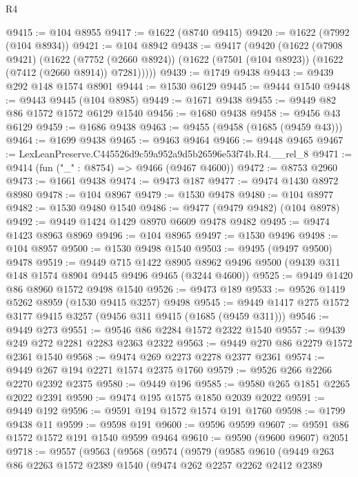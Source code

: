 \begin{lexlean}{R4}
\begin{coremodule}
@9415 := @104 @8955
@9417 := @1622 (@8740 @9415)
@9420 := @1622 (@7992 (@104 @8934))
@9421 := @104 @8942
@9438 := @9417
    (@9420
      (@1622
        (@7908 @9421)
        (@1622
          (@7752 (@2660 @8924))
          (@1622 (@7501 (@104 @8923)) (@1622 (@7412 (@2660 @8914)) @7281)))))
@9439 := @1749 @9438
@9443 := @9439 @292 @148 @1574 @8901
@9444 := @1530 @6129
@9445 := @9444 @1540
@9448 := @9443 @9445 (@104 @8985)
@9449 := @1671 @9438
@9455 := @9449 @82 @86 @1572 @1572 @6129 @1540
@9456 := @1680 @9438
@9458 := @9456 @43 @6129
@9459 := @1686 @9438
@9463 := @9455 (@9458 (@1685 (@9459 @43)))
@9464 := @1699 @9438
@9465 := @9463 @9464
@9466 := @9448 @9465
@9467 := LexLeanPreserve.C445526d9c59a952a9d5b26596e53f74b.R4.__rel_8
@9471 := @9414 (fun ("_" : @8754) => @9466 (@9467 @4600))
@9472 := @8753 @2960
@9473 := @1661 @9438
@9474 := @9473 @187
@9477 := @9474 @1430 @8972 @8980
@9478 := @104 @8967
@9479 := @1530 @9478
@9480 := @104 @8977
@9482 := @1530 @9480 @1540
@9486 := @9477 (@9479 @9482) (@104 @8978)
@9492 := @9449 @1424 @1429 @8970 @6609 @9478 @9482
@9495 := @9474 @1423 @8963 @8969
@9496 := @104 @8965
@9497 := @1530 @9496
@9498 := @104 @8957
@9500 := @1530 @9498 @1540
@9503 := @9495 (@9497 @9500) @9478
@9519 := @9449
    @715
    @1422
    @8905
    @8962
    @9496
    @9500
    (@9439 @311 @148 @1574 @8904 @9445 @9496 @9465 (@3244 @4600))
@9525 := @9449 @1420 @86 @8960 @1572 @9498 @1540
@9526 := @9473 @189
@9533 := @9526 @1419 @5262 @8959 (@1530 @9415 @3257) @9498
@9545 := @9449 @1417 @275 @1572 @3177 @9415 @3257 (@9456 @311 @9415 (@1685 (@9459 @311)))
@9546 := @9449 @273
@9551 := @9546 @86 @2284 @1572 @2322 @1540
@9557 := @9439 @249 @272 @2281 @2283 @2363 @2322
@9563 := @9449 @270 @86 @2279 @1572 @2361 @1540
@9568 := @9474 @269 @2273 @2278 @2377 @2361
@9574 := @9449 @267 @194 @2271 @1574 @2375 @1760
@9579 := @9526 @266 @2266 @2270 @2392 @2375
@9580 := @9449 @196
@9585 := @9580 @265 @1851 @2265 @2022 @2391
@9590 := @9474 @195 @1575 @1850 @2039 @2022
@9591 := @9449 @192
@9596 := @9591 @194 @1572 @1574 @191 @1760
@9598 := @1799 @9438 @11
@9599 := @9598 @191
@9600 := @9596 @9599
@9607 := @9591 @86 @1572 @1572 @191 @1540 @9599 @9464
@9610 := @9590 (@9600 @9607) @2051
@9718 := @9557
    (@9563
      (@9568
        (@9574
          (@9579
            (@9585
              @9610
              (@9449
                @263
                @86
                @2263
                @1572
                @2389
                @1540
                (@9474
                  @262
                  @2257
                  @2262
                  @2412
                  @2389

\end{coremodule}
\end{lexlean}
